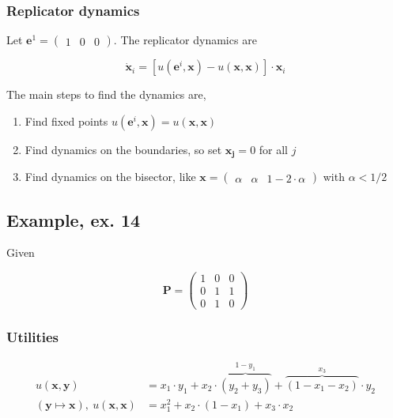 \documentclass[american]{scrartcl}
\begin{document}
\subsubsection{Replicator dynamics}

Let $\bm{e}^1 = \begin{pmatrix}
        1 & 0 & 0
    \end{pmatrix}$. The replicator dynamics are

\begin{equation}
    \dot{\bm{x}}_i = \left[ u(\bm{e}^i, \bm{x}) - u(\bm{x}, \bm{x}) \right] \cdot \bm{x}_i
\end{equation}

The main steps to find the dynamics are,

\begin{enumerate}
    \item Find fixed points $u(\bm{e}^i, \bm{x}) = u(\bm{x}, \bm{x})$
    \item Find dynamics on the boundaries, so set $\bm{x_j} = 0$ for all $j$
    \item Find dynamics on the bisector, like $\bm{x} = \begin{pmatrix}
                  \alpha & \alpha & 1 - 2\cdot \alpha
              \end{pmatrix}$ with $\alpha < 1 / 2$
\end{enumerate}

\subsection{Example, ex. 14}

Given

\begin{equation}
    \bm{P} = \begin{pmatrix}
        1 & 0 & 0 \\
        0 & 1 & 1 \\
        0 & 1 & 0
    \end{pmatrix}
\end{equation}

\subsubsection{Utilities}

\begin{equation}
    \begin{split}
        u(\bm{x}, \bm{y}) &= x_1 \cdot y_1 + x_2 \cdot \overbrace{(y_2 + y_3)}^{1 - y_1} + \overbrace{(1 - x_1 - x_2)}^{x_3} \cdot y_2 \\
        (\bm{y} \mapsto \bm{x}), \ u(\bm{x}, \bm{x}) &= x_1^2  + x_2 \cdot (1 - x_1) + x_3 \cdot x_2
    \end{split}
\end{equation}
\end{document}
